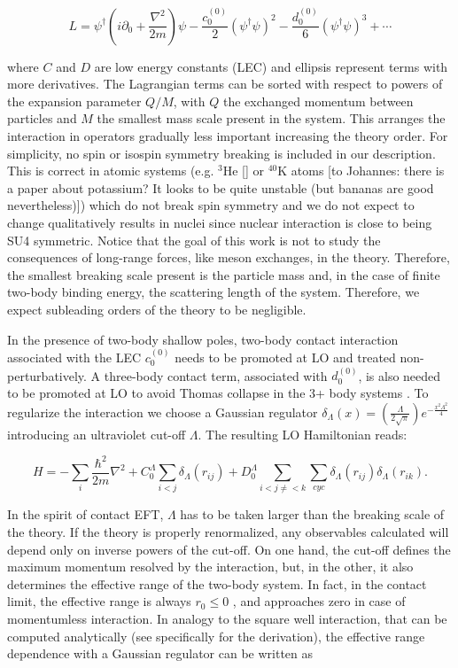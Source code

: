 \documentclass[preprint,12pt]{elsarticle}
\begin{document}
\begin{equation}
    L = \psi^\dagger \left( i\partial_0 + \frac{\nabla^2}{2m}\right)\psi -  \frac{c^{(0)}_0}{2}\left(\psi^\dagger \psi\right)^2-\frac{d^{(0)}_0}{6}\left(\psi^\dagger\psi\right)^3 + \cdots
\end{equation}

where $C$ and $D$ are low energy constants (LEC) and ellipsis represent terms with more derivatives.
The Lagrangian terms can be sorted with respect to powers of the expansion parameter $Q/M$, with $Q$ the exchanged momentum between particles and $M$ the smallest mass scale present in the system.
This arranges the interaction in operators gradually less important increasing the theory order.
For simplicity, no spin or isospin symmetry breaking is included in our description.
This is correct in atomic systems (e.g. $^3$He [] or $^{40}$K atoms [to Johannes: there is a paper about potassium? It looks to be quite unstable (but bananas are good nevertheless)]) which do not break spin symmetry and we do not expect to change qualitatively results in nuclei since nuclear interaction is close to being SU4 symmetric.
Notice that the goal of this work is not to study the consequences of long-range forces, like meson exchanges, in the theory.
Therefore, the smallest breaking scale present is the particle mass and, in the case of finite two-body binding energy, the scattering length of the system. 
Therefore, we expect subleading orders of the theory to be negligible.

In the presence of two-body shallow poles, two-body contact interaction associated with the LEC $c^{(0)}_0$ needs to be promoted at LO and treated non-perturbatively.
A three-body contact term, associated with $d^{(0)}_0$, is also needed to be promoted at LO to avoid Thomas collapse in the 3+ body systems \cite{Bedaque:1998kg}.
To regularize the interaction we choose a Gaussian regulator $\delta_\Lambda(x) = \left(\frac{\Lambda}{2\sqrt{\pi}}\right) e^{-\frac{x^2 \Lambda^2}{4}}$ introducing an ultraviolet cut-off $\Lambda$.
The resulting LO Hamiltonian reads:

\begin{equation}
H = - \sum_i \frac{\hbar^2}{2m}\nabla^2+ C_0^\Lambda \sum_{i<j}{\delta_\Lambda(r_{ij})} + D_0^\Lambda \sum_{i<j\ne<k}{\sum_{cyc}\delta_\Lambda(r_{ij})\delta_\Lambda(r_{ik})}.
\label{eq:hamiltonian}
\end{equation}


In the spirit of contact EFT, $\Lambda$ has to be taken larger than the breaking scale of the theory.
If the theory is properly renormalized, any observables calculated will depend only on inverse powers of the cut-off.
On one hand, the cut-off defines the maximum momentum resolved by the interaction, but, in the other, it also determines the effective range of the two-body system.
In fact, in the contact limit, the effective range is always $r_0\le 0$ \cite{Wigner:1955zz,Hammer:2010fw,Phillips}, and approaches zero in case of momentumless interaction.
In analogy to the square well interaction, that can be computed analytically (see specifically \cite{Phillips} for the derivation), the effective range dependence with a Gaussian regulator can be written as
\end{document}
